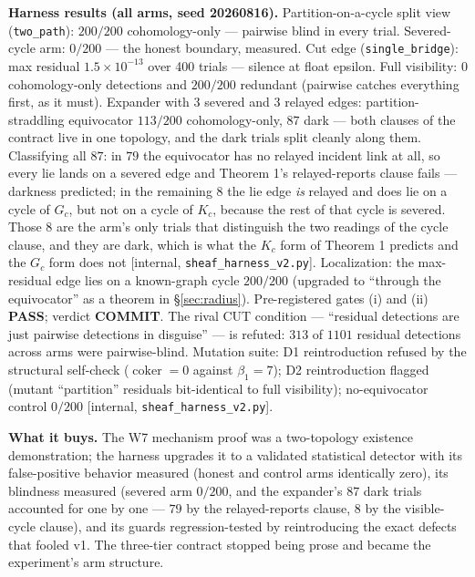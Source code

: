 \documentclass[11pt,a4paper]{article}
\begin{document}
\begin{thebox}
\textbf{Harness results (all arms, seed 20260816).} Partition-on-a-cycle split view (\texttt{two\_path}): $200/200$
cohomology-only --- pairwise blind in every trial. Severed-cycle arm: $0/200$ --- the honest boundary, measured. Cut edge
(\texttt{single\_bridge}): max residual $1.5\times10^{-13}$ over 400 trials --- silence at float epsilon. Full visibility:
$0$ cohomology-only detections and $200/200$ redundant (pairwise catches everything first, as it must). Expander with 3
severed and 3 relayed edges: partition-straddling equivocator $113/200$ cohomology-only, $87$ dark --- both clauses of the
contract live in one topology, and the dark trials split cleanly along them. Classifying all $87$: in $79$ the equivocator
has no relayed incident link at all, so every lie lands on a severed edge and Theorem 1's relayed-reports clause fails ---
darkness predicted; in the remaining $8$ the lie edge \emph{is} relayed and does lie on a cycle of $G_c$, but not on a cycle
of $K_c$, because the rest of that cycle is severed. Those $8$ are the arm's only trials that distinguish the two readings
of the cycle clause, and they are dark, which is what the $K_c$ form of Theorem 1 predicts and the $G_c$ form does not
[internal, \texttt{sheaf\_harness\_v2.py}]. Localization: the max-residual edge lies on a known-graph cycle $200/200$ (upgraded to
``through the equivocator'' as a theorem in \S\ref{sec:radius}). Pre-registered gates (i) and (ii) \textbf{PASS}; verdict \textbf{COMMIT}. The rival CUT condition --- ``residual
detections are just pairwise detections in disguise'' --- is refuted: $313$ of $1101$ residual detections across arms were
pairwise-blind. Mutation suite: D1 reintroduction refused by the structural self-check ($\operatorname{coker}=0$ against
$\beta_1=7$); D2 reintroduction flagged (mutant ``partition'' residuals bit-identical to full visibility);
no-equivocator control $0/200$ [internal, \texttt{sheaf\_harness\_v2.py}].
\end{thebox}

\textbf{What it buys.} The W7 mechanism proof was a two-topology existence demonstration; the harness upgrades it to a
validated statistical detector with its false-positive behavior measured (honest and control arms identically zero), its
blindness measured (severed arm $0/200$, and the expander's $87$ dark trials accounted for one by one --- $79$ by the
relayed-reports clause, $8$ by the visible-cycle clause), and its guards regression-tested by
reintroducing the exact defects that fooled v1. The three-tier contract stopped being prose and became the experiment's
arm structure.
\end{document}
